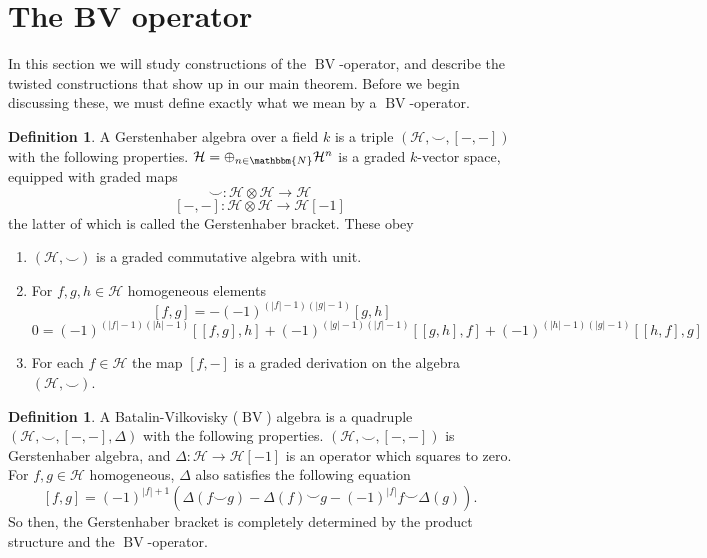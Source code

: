 \documentclass{article}
\newcommand{\bv}{\operatorname{BV}}
\theoremstyle{plain}
\theoremstyle{definition}
\newtheorem{defn}[theorem]{Definition}
\begin{document}
 
\section{The BV operator}
In this section we will study constructions of the $\bv$-operator, and describe the twisted constructions that show up in our main theorem. Before we begin discussing these, we must define exactly what we mean by a $\bv$-operator. 
\begin{defn} A Gerstenhaber algebra over a field $k$ is a triple $(\mathcal{H}, \smile, [-,-])$ with the following properties. $\mathcal{H} = \oplus_{n\in\mathbbm{N}}\mathcal{H}^n$ is a graded $k$-vector space, equipped with graded maps
$$\smile: \mathcal{H} \otimes \mathcal{H} \rightarrow \mathcal{H}$$
$$[-,-]: \mathcal{H} \otimes \mathcal{H} \rightarrow \mathcal{H}[-1]$$
the latter of which is called the Gerstenhaber bracket. These obey
\begin{enumerate}[label=(\roman*)]
\item $(\mathcal{H}, \smile)$ is a graded commutative algebra with unit.
\item For $f,g,h \in \mathcal{H}$ homogeneous elements
$$ [f,g] = -(-1)^{(|f|-1)(|g|-1)}[g,h]$$
$$0= (-1)^{(|f|-1)(|h|-1)}[[f,g],h] + (-1)^{(|g|-1)(|f|-1)}[[g,h],f] + (-1)^{(|h|-1)(|g|-1)}[[h,f],g]$$
\item For each $f \in \mathcal{H}$ the map $[f,-]$ is a graded derivation on the algebra $(\mathcal{H}, \smile)$.
\end{enumerate}
\end{defn}
\begin{defn} A Batalin-Vilkovisky ($\bv$) algebra is a quadruple $(\mathcal{H}, \smile, [-,-], \Delta)$ with the following properties. $(\mathcal{H}, \smile, [-,-])$ is Gerstenhaber algebra, and $\Delta:\mathcal{H} \rightarrow \mathcal{H}[-1]$ is an operator which squares to zero. For $f,g \in \mathcal{H}$ homogeneous, $\Delta$ also satisfies the following equation
$$[f,g] = (-1)^{|f|+1}(\Delta(f \smile g) - \Delta(f) \smile g - (-1)^{|f|} f \smile \Delta(g)).$$
So then, the Gerstenhaber bracket is completely determined by the product structure and the $\bv$-operator.
\end{defn}
\end{document}
